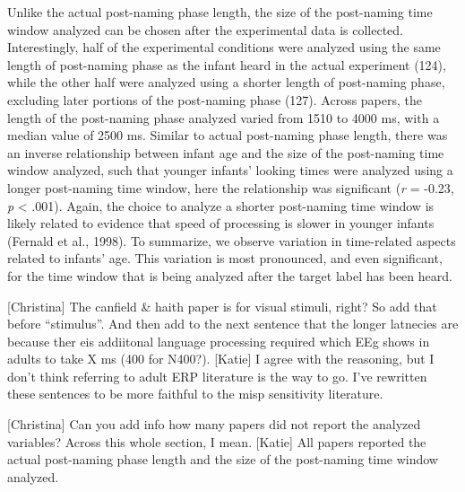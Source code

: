 \documentclass[man]{apa6}
\theoremstyle{definition}
\theoremstyle{definition}
\theoremstyle{definition}
\theoremstyle{remark}
\begin{document}
Unlike the actual post-naming phase length, the size of the post-naming
time window analyzed can be chosen after the experimental data is
collected. Interestingly, half of the experimental conditions were
analyzed using the same length of post-naming phase as the infant heard
in the actual experiment (124), while the other half were analyzed using
a shorter length of post-naming phase, excluding later portions of the
post-naming phase (127). Across papers, the length of the post-naming
phase analyzed varied from 1510 to 4000 ms, with a median value of 2500
ms. Similar to actual post-naming phase length, there was an inverse
relationship between infant age and the size of the post-naming time
window analyzed, such that younger infants' looking times were analyzed
using a longer post-naming time window, here the relationship was
significant (\emph{r} = -0.23, \emph{p} \textless{} .001). Again, the
choice to analyze a shorter post-naming time window is likely related to
evidence that speed of processing is slower in younger infants (Fernald
et al., 1998). To summarize, we observe variation in time-related
aspects related to infants' age. This variation is most pronounced, and
even significant, for the time window that is being analyzed after the
target label has been heard.

{[}Christina{]} The canfield \& haith paper is for visual stimuli,
right? So add that before \enquote{stimulus}. And then add to the next
sentence that the longer latnecies are because ther eis addiitonal
language processing required which EEg shows in adults to take X ms (400
for N400?). {[}Katie{]} I agree with the reasoning, but I don't think
referring to adult ERP literature is the way to go. I've rewritten these
sentences to be more faithful to the misp sensitivity literature.

{[}Christina{]} Can you add info how many papers did not report the
analyzed variables? Across this whole section, I mean. {[}Katie{]} All
papers reported the actual post-naming phase length and the size of the
post-naming time window analyzed.
\end{document}

